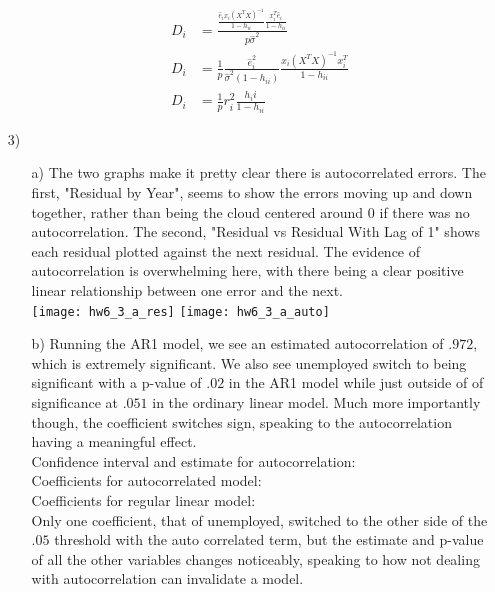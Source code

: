 \documentclass[11pt]{article}
\theoremstyle{definition}
\begin{document}
\begin{itemize}
\begin{itemize}
\begin{align*}
                    D_i &= \frac{\frac{\hat e_ix_i(X^TX)^{-1}}{1-h_{ii}}\frac{x_i^T\hat e_i}{1-h_{ii}}}{p\hat\sigma^2} \\
                    D_i &= \frac{1}{p}\frac{\hat e_i^2}{\hat\sigma^2(1-h_{ii})}\frac{x_i(X^TX)^{-1}x_i^T}{1-h_{ii}} \\
                    D_i &= \frac{1}{p} r_i^2 \frac{h_ii}{1-h_{ii}} 
                \end{align*}
        \end{itemize}
    \item[3)]
        \begin{itemize}
            \item[a)]
                The two graphs make it pretty clear there is autocorrelated errors. The first, "Residual by Year", seems to show the errors moving up and down together, rather than being the cloud centered around $0$ if there was no autocorrelation. The second, "Residual vs Residual With Lag of 1" shows each residual plotted against the next residual. The evidence of autocorrelation is overwhelming here, with there being a clear positive linear relationship between one error and the next. \\
                \texttt{[image: hw6\_3\_a\_res]} 
                \texttt{[image: hw6\_3\_a\_auto]}  \\
            \item[b)]
                Running the AR1 model, we see an estimated autocorrelation of $.972$, which is extremely significant. We also see unemployed switch to being significant with a p-value of $.02$ in the AR1 model while just outside of of significance at $.051$ in the ordinary linear model. Much more importantly though, the coefficient switches sign, speaking to the autocorrelation having a meaningful effect.\\
                Confidence interval and estimate for autocorrelation: \\

                 

                Coefficients for autocorrelated model: \\

                

                Coefficients for regular linear model: \\
                

                Only one coefficient, that of unemployed, switched to the other side of the $.05$ threshold with the auto correlated term, but the estimate and p-value of all the other variables changes noticeably, speaking to how not dealing with autocorrelation can invalidate a model.


\end{itemize}
\end{itemize}
\end{document}
